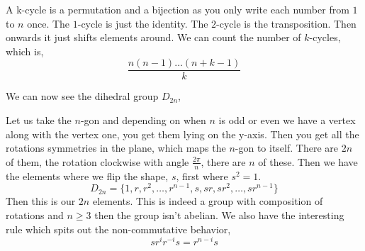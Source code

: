 A k-cycle is a permutation and a bijection as you only write each number from $1$ to $n$ once. The $1$-cycle is just the identity. The $2$-cycle is the transposition. Then onwards it just shifts elements around. We can count the number of $k$-cycles, which is,
$$ \frac{n(n-1) \dots (n + k -1)}{k} $$

We can now see the dihedral group $D_{2n}$,
\begin{ndefi}
  Let us take the $n$-gon and depending on when $n$ is odd or even we have a vertex along with the vertex one, you get them lying on the y-axis. Then you get all the rotations symmetries in the plane, which maps the $n$-gon to itself. There are $2n$ of them, the rotation clockwise with angle $\frac{2\pi}{n}$, there are $n$ of these. Then we have the elements where we flip the shape, $s$, first where $s^2 = 1$.
  $$ D_{2n} = \{1, r, r^2, \dots, r^{n-1}, s, sr, sr^2, \dots, sr^{n-1} \} $$
  Then this is our $2n$ elements. This is indeed a group with composition of rotations and $n \ge 3$ then the group isn't abelian. We also have the interesting rule which spits out the non-commutative behavior,
  $$ sr^i r^{-i}s = r^{n-i}s $$
\end{ndefi}

